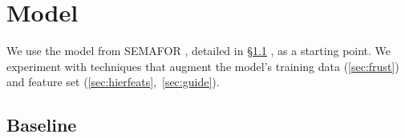 \documentclass[11pt,a4paper]{article}
\newcommand{\finalversion}[1]{}
\begin{document}
\finalversion{
PropBank provides one million words of fully annotated English sentences.
Very little data is annotated with both PropBank and FrameNet analyses.
Therefore, to bridge between the PropBank and FrameNet corpora, 
we run a PropBank-trained semantic role labeler 
on the FrameNet data as an additional form of preprocessing.\footnote{In preliminary experiments, 
we tried to leverage PropBank annotations in SemLink \citep{bonial-13}, which include mappings to FrameNet.
We found that FrameNet mappings in SemLink are noisy/incomplete; including 
SemLink sentences in the training data only hurt performance.}
}

\section{Model}

We use the model from SEMAFOR \citep{das-14}, detailed in
\S\ref{sec:base_model}%
, as a starting point.
We experiment with %
techniques that augment
the model's training data (\cref{sec:frust}) and feature set %
(\cref{sec:hierfeats},~\cref{sec:guide}).

\subsection{Baseline}
\label{sec:base_model}
\end{document}

